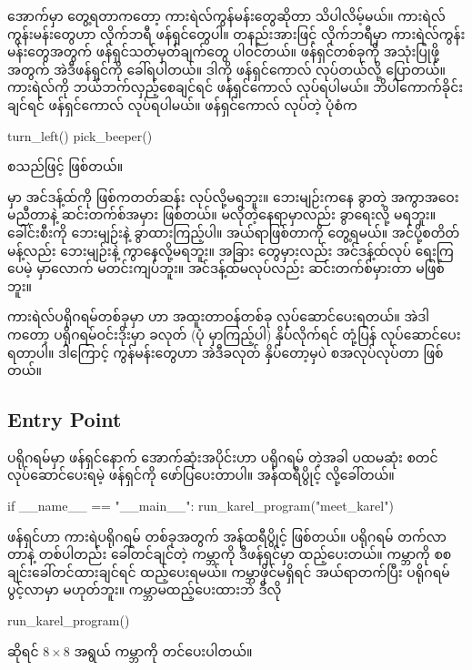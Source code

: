  အောက်မှာ တွေ့ရတာကတော့ ကားရဲလ်ကွန်မန်းတွေဆိုတာ သိပါလိမ့်မယ်။ ကားရဲလ်ကွန်းမန်းတွေဟာ  လိုက်ဘရီ ဖန်ရှင်တွေပါ။ တနည်းအားဖြင့်  လိုက်ဘရီမှာ ကားရဲလ်ကွန်းမန်းတွေအတွက် ဖန်ရှင်သတ်မှတ်ချက်တွေ ပါဝင်တယ်။ ဖန်ရှင်တစ်ခုကို အသုံးပြုဖို့အတွက် အဲဒီဖန်ရှင်ကို ခေါ်ရပါတယ်။ ဒါကို   ဖန်ရှင်ကောလ်  လုပ်တယ်လို့ ပြောတယ်။ ကားရဲလ်ကို ဘယ်ဘက်လှည့်စေချင်ရင်  ဖန်ရှင်ကောလ် လုပ်ရပါမယ်။ ဘိပါကောက်ခိုင်းချင်ရင်  ဖန်ရှင်ကောလ် လုပ်ရပါမယ်။ ဖန်ရှင်ကောလ် လုပ်တဲ့ ပုံစံက
%
\begin{py}
turn_left()
pick_beeper()
\end{py}
စသည်ဖြင့် ဖြစ်တယ်။

\begin{mytcboxflt}
 မှာ အင်ဒန့်ထ်ကို ဖြစ်ကတတ်ဆန်း လုပ်လို့မရဘူး။ ဘေးမျဉ်းကနေ ခွာတဲ့ အကွာအဝေး မညီတာနဲ့ ဆင်းတက်စ်အမှား ဖြစ်တယ်။ မလိုတဲ့နေရာမှာလည်း ခွာရေးလို့ မရဘူး။ ခေါင်းစီးကို ဘေးမျဉ်းနဲ့ ခွာထားကြည့်ပါ။ အယ်ရာဖြစ်တာကို တွေ့ရမယ်။ အင်ပို့စတိတ်မန့်လည်း ဘေးမျဉ်းနဲ့ ကွာနေလို့မရဘူး။ အခြား  တွေမှားလည်း အင်ဒန့်ထ်လုပ် ရေးကြပေမဲ့  မှာလောက် မတင်းကျပ်ဘူး။ အင်ဒန့်ထ်မလုပ်လည်း ဆင်းတက်စ်မှားတာ မဖြစ်ဘူး။
\end{mytcboxflt}

ကားရဲလ်ပရိုဂရမ်တစ်ခုမှာ  ဟာ  အထူးတာဝန်တစ်ခု လုပ်ဆောင်ပေးရတယ်။ အဲဒါကတော့ ပရိုဂရမ်ဝင်းဒိုးမှာ   ခလုတ် (ပုံ \fRefNo{\ref{fig:mtkrlprgm1}} မှာကြည့်ပါ) နှိပ်လိုက်ရင် တုံ့ပြန် လုပ်ဆောင်ပေးရတာပါ။ ဒါကြောင့် ကွန်မန်းတွေဟာ အဲဒီခလုတ် နှိပ်တော့မှပဲ စအလုပ်လုပ်တာ ဖြစ်တယ်။

\subsection*{Entry Point}
 ပရိုဂရမ်မှာ  ဖန်ရှင်နောက် အောက်ဆုံးအပိုင်းဟာ ပရိုဂရမ်  တဲ့အခါ ပထမဆုံး စတင်လုပ်ဆောင်ပေးရမဲ့ ဖန်ရှင်ကို ဖော်ပြပေးတာပါ။ အန်ထရီပွိုင့်  လို့ခေါ်တယ်။ 
%
\begin{py}
if __name__ == "__main__":
    run_karel_program("meet_karel")
\end{py}
%
 ဖန်ရှင်ဟာ ကားရဲပရိုဂရမ် တစ်ခုအတွက် အန်ထရီပွိုင့် ဖြစ်တယ်။  ပရိုဂရမ် တက်လာတာနဲ့ တစ်ပါတည်း ခေါ်တင်ချင်တဲ့ ကမ္ဘာကို ဒီဖန်ရှင်မှာ ထည့်ပေးတယ်။  ကမ္ဘာကို စစချင်းခေါ်တင်ထားချင်ရင်  ထည့်ပေးရမယ်။  ကမ္ဘာဖိုင်မရှိရင် အယ်ရာတက်ပြီး ပရိုဂရမ်ပွင့်လာမှာ မဟုတ်ဘူး။ ကမ္ဘာမထည့်ပေးထားဘဲ ဒီလို
%
\begin{py}
run_karel_program()
\end{py}
%
ဆိုရင် $8 \times 8$ အရွယ်  ကမ္ဘာကို တင်ပေးပါတယ်။

